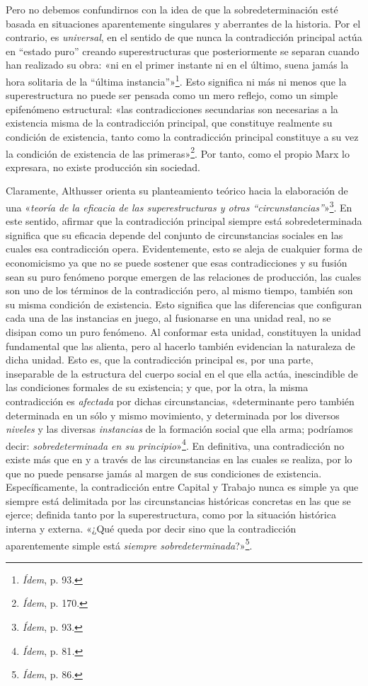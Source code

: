 Pero no debemos confundirnos con la idea de que la sobredeterminación esté basada en situaciones aparentemente singulares y aberrantes de la historia. Por el contrario, es \emph{universal}, en el sentido de que nunca la contradicción principal actúa en ``estado puro'' creando superestructuras que posteriormente se separan cuando han realizado su obra: «ni en el primer instante ni en el último, suena jamás la hora solitaria de la ``última instancia''»\footnote{\emph{Ídem}, p. 93.}. Esto significa ni más ni menos que la superestructura no puede ser pensada como un mero reflejo, como un simple epifenómeno estructural: «las contradicciones secundarias son necesarias a la existencia misma de la contradicción principal, que constituye realmente su condición de existencia, tanto como la contradicción principal constituye a su vez la condición de existencia de las primeras»\footnote{\emph{Ídem}, p. 170.}. Por tanto, como el propio Marx lo expresara, no existe producción sin sociedad.

Claramente, Althusser orienta su planteamiento teórico hacia la elaboración de una «\emph{teoría de la eficacia de las superestructuras y otras ``circunstancias''}»\footnote{\emph{Ídem}, p. 93.}. En este sentido, afirmar que la contradicción principal siempre está sobredeterminada significa que su eficacia depende del conjunto de circunstancias sociales en las cuales esa contradicción opera. Evidentemente, esto se aleja de cualquier forma de economicismo ya que no se puede sostener que esas contradicciones y su fusión sean su puro fenómeno porque emergen de las relaciones de producción, las cuales son uno de los términos de la contradicción pero, al mismo tiempo, también son su misma condición de existencia. Esto significa que las diferencias que configuran cada una de las instancias en juego, al fusionarse en una unidad real, no se disipan como un puro fenómeno. Al conformar esta unidad\emph{,} constituyen la unidad fundamental que las alienta, pero al hacerlo también evidencian la naturaleza de dicha unidad. Esto es, que la contradicción principal es, por una parte, inseparable de la estructura del cuerpo social en el que ella actúa, inescindible de las condiciones formales de su existencia; y que, por la otra, la misma contradicción es \emph{afectada} por dichas circunstancias, «determinante pero también determinada en un sólo y mismo movimiento, y determinada por los diversos \emph{niveles} y las diversas \emph{instancias} de la formación social que ella arma; podríamos decir: \emph{sobredeterminada en su principio}»\footnote{\emph{Ídem}, p. 81\emph{.}}. En definitiva, una contradicción no existe más que en y a través de las circunstancias en las cuales se realiza, por lo que no puede pensarse jamás al margen de sus condiciones de existencia. Específicamente, la contradicción entre Capital y Trabajo nunca es simple ya que siempre está delimitada por las circunstancias históricas concretas en las que se ejerce; definida tanto por la superestructura, como por la situación histórica interna y externa. «¿Qué queda por decir sino que la contradicción aparentemente simple está \emph{siempre sobredeterminada}?»\footnote{\emph{Ídem}, p. 86.}.


